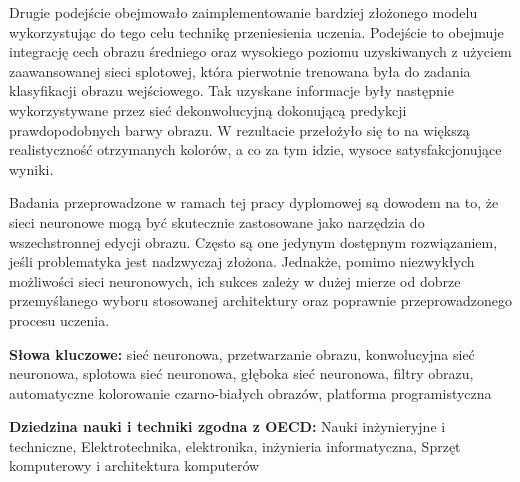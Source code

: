   Drugie podejście obejmowało zaimplementowanie bardziej złożonego modelu
  wykorzystując do tego celu technikę przeniesienia uczenia. Podejście to obejmuje
  integrację cech obrazu średniego oraz wysokiego poziomu uzyskiwanych z użyciem
  zaawansowanej sieci splotowej, która pierwotnie trenowana była do zadania
  klasyfikacji obrazu wejściowego.
  Tak uzyskane informacje były następnie wykorzystywane przez sieć
  dekonwolucyjną dokonującą predykcji prawdopodobnych barwy obrazu.
  W rezultacie przełożyło się to na większą realistyczność otrzymanych kolorów,
  a co za tym idzie, wysoce satysfakcjonujące wyniki.

  Badania przeprowadzone w ramach tej pracy dyplomowej są dowodem na to, że
  sieci neuronowe mogą być skutecznie zastosowane jako narzędzia do wszechstronnej
  edycji obrazu. Często są one jedynym dostępnym rozwiązaniem, jeśli problematyka
  jest nadzwyczaj złożona. Jednakże, pomimo niezwykłych możliwości sieci
  neuronowych, ich sukces zależy w dużej mierze od dobrze przemyślanego
  wyboru stosowanej architektury oraz poprawnie przeprowadzonego
  procesu uczenia.

  \bigskip

  \noindent\textbf{Słowa kluczowe:} sieć neuronowa, przetwarzanie obrazu,
  konwolucyjna sieć neuronowa, splotowa sieć neuronowa,
  głęboka sieć neuronowa, filtry obrazu, automatyczne kolorowanie czarno-białych
  obrazów, platforma programistyczna

  \bigskip

  \noindent\textbf{Dziedzina nauki i techniki zgodna z OECD:} Nauki
  inżynieryjne i techniczne, Elektrotechnika, elektronika, inżynieria
  informatyczna, Sprzęt komputerowy i architektura komputerów
